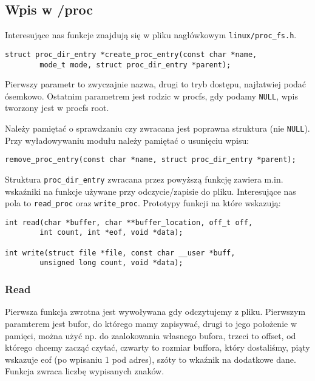 \documentclass[a4paper]{article}
\begin{document}
\subsection{Wpis w /proc}
Interesujące nas funkcje znajdują się w pliku nagłówkowym
\texttt{linux/proc\_fs.h}.
\begin{verbatim}
struct proc_dir_entry *create_proc_entry(const char *name,
        mode_t mode, struct proc_dir_entry *parent);
\end{verbatim}
Pierwszy parametr to zwyczajnie nazwa, drugi to tryb dostępu, najłatwiej podać
ósemkowo. Ostatnim parametrem jest rodzic w procfs, gdy podamy \texttt{NULL},
wpis tworzony jest w procfs root.

Należy pamiętać o sprawdzaniu czy zwracana jest poprawna struktura (nie
\texttt{NULL}). Przy wyładowywaniu modułu należy pamiętać o usunięciu wpisu:
\begin{verbatim}
remove_proc_entry(const char *name, struct proc_dir_entry *parent);
\end{verbatim}

Struktura \texttt{proc\_dir\_entry} zwracana przez powyższą funkcję zawiera
m.in. wskaźniki na funkcje używane przy odczycie/zapisie do pliku.
Interesujące nas pola to \texttt{read\_proc} oraz
\texttt{write\_proc}\cite{lkmpg}. Prototypy funkcji na które wskazują:

\begin{verbatim}
int read(char *buffer, char **buffer_location, off_t off,
        int count, int *eof, void *data);

int write(struct file *file, const char __user *buff,
        unsigned long count, void *data);
\end{verbatim}

\subsubsection{Read}
Pierwsza funkcja zwrotna jest wywoływana gdy odczytujemy z pliku. Pierwszym
paramterem jest bufor, do którego mamy zapisywać, drugi to jego położenie w
pamięci, można użyć np. do zaalokowania własnego bufora, trzeci to offset, od
którego chcemy zacząć czytać, czwarty to rozmiar buffora, który dostaliśmy,
piąty wskazuje eof (po wpisaniu 1 pod adres), szóty to wkaźnik na dodatkowe
dane. Funkcja zwraca liczbę wypisanych znaków.
\end{document}
